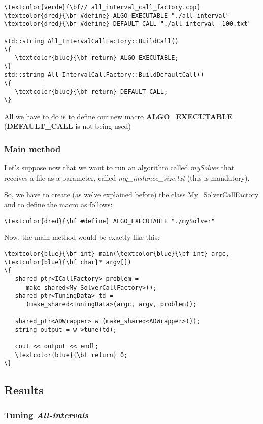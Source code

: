 \begin{Verbatim}[fontsize=\normalsize]
\textcolor{verde}{\bf// all_interval_call_factory.cpp}
\textcolor{dred}{\bf #define} ALGO_EXECUTABLE "./all-interval"
\textcolor{dred}{\bf #define} DEFAULT_CALL "./all-interval _100.txt"

std::string All_IntervalCallFactory::BuildCall()
\{
   \textcolor{blue}{\bf return} ALGO_EXECUTABLE;
\}
std::string All_IntervalCallFactory::BuildDefaultCall()
\{
   \textcolor{blue}{\bf return} DEFAULT_CALL;
\}
\end{Verbatim}

All we have to do is to define our new macro {\bf ALGO\_EXECUTABLE} ({\bf DEFAULT\_CALL} is not being used)

\subsubsection{Main method}

Let's suppose now that we want to run an algorithm called {\it mySolver} that receives a file as a parameter, called {\it my\_instance\_size.txt} (this is mandatory).

So, we have to create (as we've explained before) the class {\sc My\_SolverCallFactory} and to define the macro as follows:

\begin{Verbatim}[fontsize=\normalsize]
\textcolor{dred}{\bf #define} ALGO_EXECUTABLE "./mySolver"
\end{Verbatim}

Now, the main method would be exactly like this:

\begin{Verbatim}[fontsize=\normalsize]
\textcolor{blue}{\bf int} main(\textcolor{blue}{\bf int} argc, \textcolor{blue}{\bf char}* argv[])
\{
   shared_ptr<ICallFactory> problem = 
      make_shared<My_SolverCallFactory>();
   shared_ptr<TuningData> td = 
      (make_shared<TuningData>(argc, argv, problem));

   shared_ptr<ADWrapper> w (make_shared<ADWrapper>());
   string output = w->tune(td);

   cout << output << endl;
   \textcolor{blue}{\bf return} 0;
\}
\end{Verbatim}

\subsection{Results}

\subsubsection{ Tuning {\it All-intervals}}

